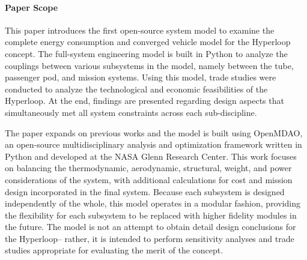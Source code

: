 \paragraph{Paper Scope}
    This paper introduces the first open-source system model to examine the
    complete energy consumption and converged vehicle model for the Hyperloop concept.
    The full-system engineering model is built in Python to analyze the couplings
    between various subsystems in the model, namely between the tube, passenger pod, and
    mission systems. Using this model, trade studies were conducted to analyze the technological
    and economic feasibilities of the Hyperloop.
    At the end, findings are presented regarding design aspects that simultaneously
    met all system constraints across each sub-discipline.

    The paper expands on previous works \cite{Chin} and the model is built
    using OpenMDAO, an open-source multidisciplinary analysis and optimization
    framework written in Python and developed at the NASA Glenn Research Center.
    This work focuses on balancing the thermodynamic, aerodynamic, structural,
    weight, and power considerations of the system, with additional calculations for cost
    and mission design incorporated in the final system. Because each subsystem
    is designed independently of the whole, this model operates in a modular fashion,
    providing the flexibility for each subsystem to be replaced with higher
    fidelity modules in the future.
    The model is not an attempt to obtain detail design conclusions for the
    Hyperloop-- rather, it is intended to perform sensitivity analyses
    and trade studies appropriate for evaluating the merit of the concept.

